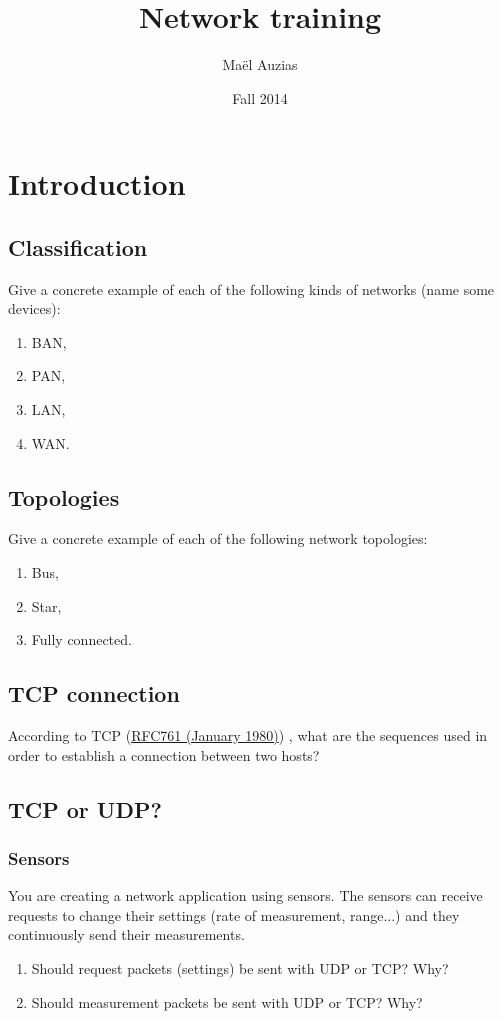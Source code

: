 \documentclass[11pt]{article}
\begin{document}
\title{Network training}
\date{Fall 2014}
\author{Maël Auzias}
\maketitle

\tableofcontents
\pagebreak


\section{Introduction}
\subsection{Classification}
Give a concrete example of each of the following kinds of networks (name some devices):
  \begin{enumerate}
    \item BAN,
    \item PAN,
    \item LAN,
    \item WAN.
  \end{enumerate}

\subsection{Topologies}
Give a concrete example of each of the following network topologies:
  \begin{enumerate}
    \item Bus,
    \item Star,
    \item Fully connected.
  \end{enumerate}

\subsection{TCP connection}
According to TCP (\color{blue}\href{http://tools.ietf.org/html/rfc761}{RFC761 (January 1980)}) \color{black}, what are the sequences used in order to establish a connection between two hosts?

\subsection{TCP or UDP?}
\subsubsection{Sensors}
You are creating a network application using sensors. The sensors can receive requests to change their settings (rate of measurement, range...) and they continuously send their measurements.
  \begin{enumerate}
    \item Should request packets (settings) be sent with UDP or TCP? Why?
    \item Should measurement packets be sent with UDP or TCP? Why?
  \end{enumerate}
\end{document}
